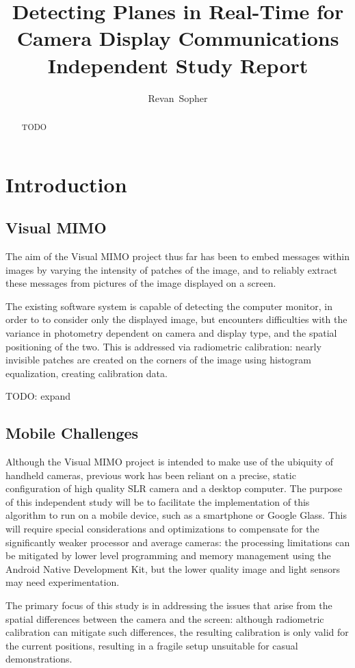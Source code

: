 \documentclass[11pt, letterpaper]{article}
\author{Revan~Sopher}
\title{Detecting Planes in Real-Time for Camera Display Communications\\
{\large Independent Study Report}}
\begin{document}
\maketitle

\begin{abstract}
TODO
\end{abstract}

\section{Introduction}

\subsection{Visual MIMO}
The aim of the Visual MIMO project thus far has been to embed messages within images by varying the intensity of patches of the image, and to reliably extract these messages from pictures of the image displayed on a screen.

The existing software system is capable of detecting the computer monitor, in order to to consider only the displayed image, but encounters difficulties with the variance in photometry dependent on camera and display type, and the spatial positioning of the two.
This is addressed via radiometric calibration: nearly invisible patches are created on the corners of the image using histogram equalization, creating calibration data.

TODO: expand

\subsection{Mobile Challenges}
Although the Visual MIMO project is intended to make use of the ubiquity of handheld cameras, previous work has been reliant on a precise, static configuration of high quality SLR camera and a desktop computer.
The purpose of this independent study will be to facilitate the implementation of this algorithm to run on a mobile device, such as a smartphone or Google Glass.
This will require special considerations and optimizations to compensate for the significantly weaker processor and average cameras: the processing limitations can be mitigated by lower level programming and memory management using the Android Native Development Kit, but the lower quality image and light sensors may need experimentation.

The primary focus of this study is in addressing the issues that arise from the spatial differences between the camera and the screen: although radiometric calibration can mitigate such differences, the resulting calibration is only valid for the current positions, resulting in a fragile setup unsuitable for casual demonstrations.
\end{document}
